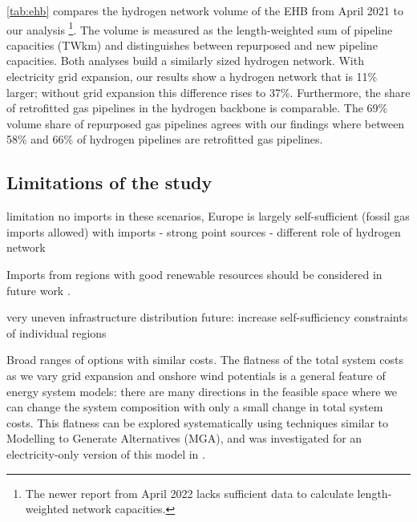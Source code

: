 \cref{tab:ehb} compares the hydrogen network volume of the EHB from April 2021
to our analysis \cite{gasforclimateExtendingEuropean2021}\footnote{The newer
report from April 2022 \cite{gasforclimateEuropeanHydrogen2022} lacks sufficient
data to calculate length-weighted network capacities.}. The volume is measured
as the length-weighted sum of pipeline capacities (TWkm) and distinguishes
between repurposed and new pipeline capacities. Both analyses build a similarly
sized hydrogen network. With electricity grid expansion, our results show a
hydrogen network that is 11\% larger; without grid expansion this difference
rises to 37\%. Furthermore, the share of retrofitted gas pipelines in the
hydrogen backbone is comparable. The 69\% volume share of repurposed gas
pipelines \cite{gasforclimateExtendingEuropean2021} agrees with our findings
where between 58\% and 66\% of hydrogen pipelines are retrofitted gas pipelines.

\subsection*{Limitations of the study}

limitation no imports
in these scenarios, Europe is largely self-sufficient (fossil gas imports allowed)
with imports
- strong point sources
- different role of hydrogen network

Imports from regions with good renewable
resources should be considered in future work
\cite{fasihiTechnoeconomicAssessment2019,heuserTechnoeconomicAnalysis2019}.

very uneven infrastructure distribution
future: increase self-sufficiency constraints of individual regions

Broad ranges of options with similar costs. The flatness of the total system
costs as we vary grid expansion and onshore wind potentials is a general feature
of energy system models: there are many directions in the feasible space where
we can change the system composition with only a small change in total system
costs. This flatness can be explored systematically using techniques similar to
Modelling to Generate Alternatives (MGA), and was investigated for an
electricity-only version of this model in \cite{Neumann2019}.
